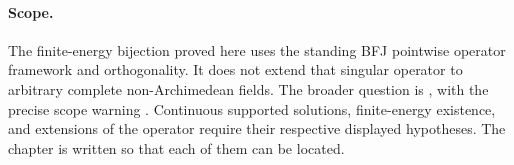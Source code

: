 \paragraph{Scope.}
The finite-energy bijection proved here uses the standing BFJ
pointwise operator framework and orthogonality.  It does not extend
that singular operator to arbitrary complete non-Archimedean fields.
The broader question is , with the
precise scope warning \cite[Remark~4.4]{PS23Hybrid}.
Continuous supported solutions, finite-energy existence, and
extensions of the operator require their respective displayed
hypotheses.  The chapter is written so that each of them can be located.
